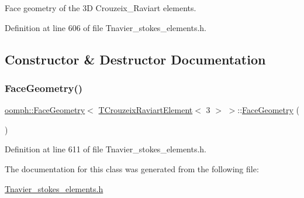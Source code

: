 Face geometry of the 3D Crouzeix\+\_\+\+Raviart elements. 

Definition at line 606 of file Tnavier\+\_\+stokes\+\_\+elements.\+h.



\subsection{Constructor \& Destructor Documentation}
\mbox{\label{classoomph_1_1FaceGeometry_3_01TCrouzeixRaviartElement_3_013_01_4_01_4_a471c39f7b8167933076a8db632686326}} 
\subsubsection{\texorpdfstring{Face\+Geometry()}{FaceGeometry()}}
{\footnotesize\ttfamily \hyperlink{classoomph_1_1FaceGeometry}{oomph\+::\+Face\+Geometry}$<$ \hyperlink{classoomph_1_1TCrouzeixRaviartElement}{T\+Crouzeix\+Raviart\+Element}$<$ 3 $>$ $>$\+::\hyperlink{classoomph_1_1FaceGeometry}{Face\+Geometry} (\begin{DoxyParamCaption}{ }\end{DoxyParamCaption})\hspace{0.3cm}{\ttfamily [inline]}}



Definition at line 611 of file Tnavier\+\_\+stokes\+\_\+elements.\+h.



The documentation for this class was generated from the following file\+:\begin{DoxyCompactItemize}
\item 
\hyperlink{Tnavier__stokes__elements_8h}{Tnavier\+\_\+stokes\+\_\+elements.\+h}\end{DoxyCompactItemize}
